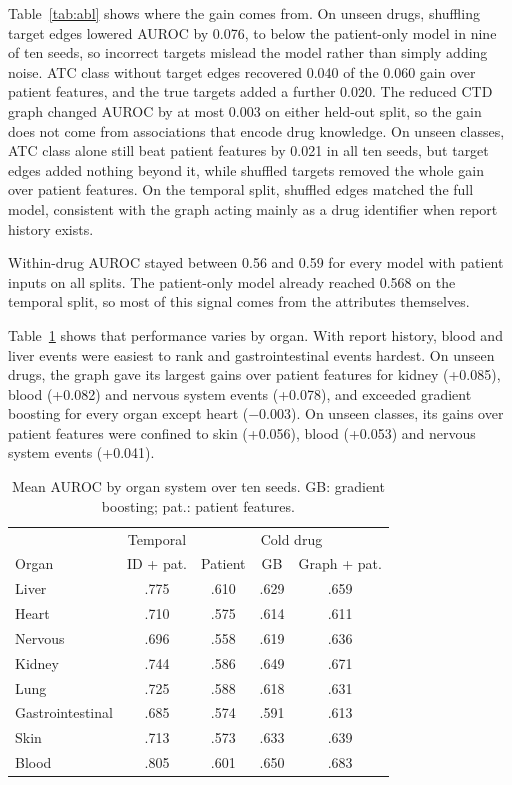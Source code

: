 \documentclass[conference,letterpaper]{IEEEtran}
\begin{document}
Table~\ref{tab:abl} shows where the gain comes from. On unseen drugs, shuffling target edges lowered AUROC by 0.076, to below the patient-only model in nine of ten seeds, so incorrect targets mislead the model rather than simply adding noise. ATC class without target edges recovered 0.040 of the 0.060 gain over patient features, and the true targets added a further 0.020. The reduced CTD graph changed AUROC by at most 0.003 on either held-out split, so the gain does not come from associations that encode drug knowledge. On unseen classes, ATC class alone still beat patient features by 0.021 in all ten seeds, but target edges added nothing beyond it, while shuffled targets removed the whole gain over patient features. On the temporal split, shuffled edges matched the full model, consistent with the graph acting mainly as a drug identifier when report history exists.

Within-drug AUROC stayed between 0.56 and 0.59 for every model with patient inputs on all splits. The patient-only model already reached 0.568 on the temporal split, so most of this signal comes from the attributes themselves.

Table~\ref{tab:organ} shows that performance varies by organ. With report history, blood and liver events were easiest to rank and gastrointestinal events hardest. On unseen drugs, the graph gave its largest gains over patient features for kidney (+0.085), blood (+0.082) and nervous system events (+0.078), and exceeded gradient boosting for every organ except heart ($-$0.003). On unseen classes, its gains over patient features were confined to skin (+0.056), blood (+0.053) and nervous system events (+0.041).

\begin{table}[t]
\centering
\caption{Mean AUROC by organ system over ten seeds. GB: gradient boosting; pat.: patient features.}
\label{tab:organ}
\footnotesize
\setlength{\tabcolsep}{3pt}
\begin{tabular}{lcccc}
\toprule
 & Temporal & \multicolumn{3}{c}{Cold drug} \\
Organ & ID + pat. & Patient & GB & Graph + pat. \\
\midrule
Liver & .775 & .610 & .629 & .659 \\
Heart & .710 & .575 & .614 & .611 \\
Nervous & .696 & .558 & .619 & .636 \\
Kidney & .744 & .586 & .649 & .671 \\
Lung & .725 & .588 & .618 & .631 \\
Gastrointestinal & .685 & .574 & .591 & .613 \\
Skin & .713 & .573 & .633 & .639 \\
Blood & .805 & .601 & .650 & .683 \\
\bottomrule
\end{tabular}
\end{table}
\end{document}
